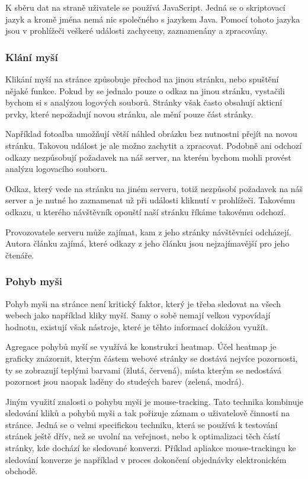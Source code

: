 \documentclass[bc,male,java,dept456]{diploma}						%
\begin{document}
K sběru dat na straně uživatele se používá JavaScript. Jedná se o skriptovací jazyk a kromě jména nemá nic společného s jazykem Java. Pomocí tohoto jazyka jsou v prohlížeči veškeré události zachyceny, zaznamenány a zpracovány.

\subsubsection{Klání myší}

Klikání myší na stránce způsobuje přechod na jinou stránku, nebo spuštění nějaké funkce. Pokud by se jednalo pouze o odkaz na jinou stránku, vystačili bychom si s analýzou logových souborů. Stránky však často obsahují akticní prvky, které nepožadují novou stránku, ale mění pouze část stránky. 

Například fotoalba umožňují větší náhled obrázku bez nutnostni přejít na novou stránku. Takovou událost je ale možno zachytit a zpracovat. Podobně ani odchozí odkazy nezpůsobují požadavek na náš server, na kterém bychom mohli provést analýzu logovacího souboru. 

Odkaz, který vede na stránku na jiném serveru, totiž nezpůsobí požadavek na náš server a je nutné ho zaznamenat už při události kliknutí v prohlížeči. Takovému odkazu, u kterého návštěvník opouští naší stránku říkáme takovému odchozí. 

Provozovatele serveru může zajímat, kam z jeho stránky návštěvníci odcházejí. Autora článku zajímá, které odkazy z jeho článku jsou nejzajímavější pro jeho čtenáře.


\subsubsection{Pohyb myši}

Pohyb myši na stránce není kritický faktor, který je třeba sledovat na všech webech jako například kliky myší. Samy o sobě nemají velkou vypovídají hodnotu, existují však nástroje, které je těhto informací dokážou využít.

Agregace pohybů myší se využívá ke konstrukci heatmap. Účel heatmap je graficky znázornit, kterým částem webové stránky se dostává nejvíce pozornosti, ty se zobrazují teplými barvami (žlutá, červená), místa kterým se nedostává pozornost jsou naopak la\-dě\-ny do studeých barev (zelená, modrá).

Jiným využití znalosti o pohybu myši je mouse-tracking. Tato technika kombinuje sledování kliků a pohybů myši a tak pořizuje záznam o uživatelově činnosti na stránce. Jedná se o velmi specifickou techniku, která se používá k testování stránek ještě dřív, než se uvolní na veřejnost, nebo k optimalizaci těch částí stránky, kde dochází ke sledované konverzi. Příklad apliakce mouse-trackingu ke sledování konverze je například v proces dokončení objednávky elektronickém obchodě.
\end{document}
